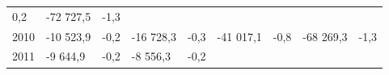 \begin{longtable}[]{@{}lllllllll@{}}
\begin{minipage}[t]{0.06\columnwidth}
0,2\strut
\end{minipage} & \begin{minipage}[t]{0.09\columnwidth}\raggedright
-72 727,5\strut
\end{minipage} & \begin{minipage}[t]{0.06\columnwidth}\raggedright
-1,3\strut
\end{minipage}\tabularnewline
\begin{minipage}[t]{0.05\columnwidth}\raggedright
2010\strut
\end{minipage} & \begin{minipage}[t]{0.10\columnwidth}\raggedright
-10 523,9\strut
\end{minipage} & \begin{minipage}[t]{0.06\columnwidth}\raggedright
-0,2\strut
\end{minipage} & \begin{minipage}[t]{0.16\columnwidth}\raggedright
-16 728,3\strut
\end{minipage} & \begin{minipage}[t]{0.06\columnwidth}\raggedright
-0,3\strut
\end{minipage} & \begin{minipage}[t]{0.12\columnwidth}\raggedright
-41 017,1\strut
\end{minipage} & \begin{minipage}[t]{0.06\columnwidth}\raggedright
-0,8\strut
\end{minipage} & \begin{minipage}[t]{0.09\columnwidth}\raggedright
-68 269,3\strut
\end{minipage} & \begin{minipage}[t]{0.06\columnwidth}\raggedright
-1,3\strut
\end{minipage}\tabularnewline
\begin{minipage}[t]{0.05\columnwidth}\raggedright
2011\strut
\end{minipage} & \begin{minipage}[t]{0.10\columnwidth}\raggedright
-9 644,9\strut
\end{minipage} & \begin{minipage}[t]{0.06\columnwidth}\raggedright
-0,2\strut
\end{minipage} & \begin{minipage}[t]{0.16\columnwidth}\raggedright
-8 556,3\strut
\end{minipage} & \begin{minipage}[t]{0.06\columnwidth}\raggedright
-0,2\strut
\end{minipage} & \begin{minipage}[t]{0.12\columnwidth}\raggedright

\end{minipage}
\end{longtable}
